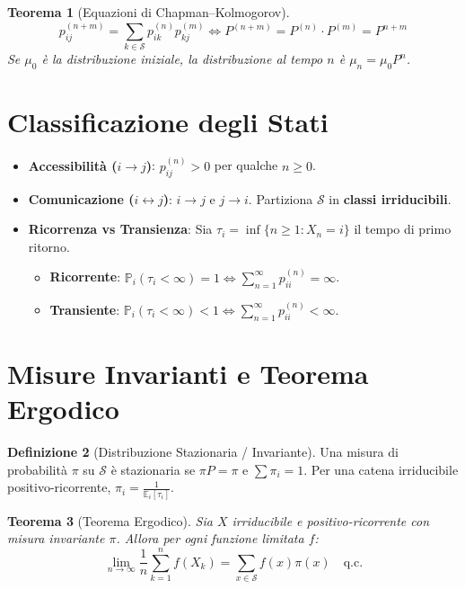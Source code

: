 \documentclass[11pt, a4paper]{report}
\theoremstyle{plain}
\newtheorem{theorem}{Teorema}[chapter]
\theoremstyle{definition}
\newtheorem{definition}[theorem]{Definizione}
\theoremstyle{remark}
\newcommand{\PP}{\mathbb{P}}
\newcommand{\E}{\mathbb{E}}
\newcommand{\1}{\mathbf{1}}
\begin{document}
\begin{theorem}[Equazioni di Chapman--Kolmogorov]
\[ p_{ij}^{(n+m)} = \sum_{k \in \mathcal{S}} p_{ik}^{(n)} p_{kj}^{(m)} \iff P^{(n+m)} = P^{(n)} \cdot P^{(m)} = P^{n+m} \]
Se $\mu_0$ è la distribuzione iniziale, la distribuzione al tempo $n$ è $\mu_n = \mu_0 P^n$.
\end{theorem}

\section{Classificazione degli Stati}

\begin{itemize}
    \item \textbf{Accessibilità ($i \to j$)}: $p_{ij}^{(n)} > 0$ per qualche $n \ge 0$.
    \item \textbf{Comunicazione ($i \leftrightarrow j$)}: $i \to j$ e $j \to i$. Partiziona $\mathcal{S}$ in \textbf{classi irriducibili}.
    \item \textbf{Ricorrenza vs Transienza}: Sia $\tau_i = \inf\{n \ge 1 : X_n = i\}$ il tempo di primo ritorno.
    \begin{itemize}
        \item \textbf{Ricorrente}: $\PP_i(\tau_i < \infty) = 1 \iff \sum_{n=1}^\infty p_{ii}^{(n)} = \infty$.
        \item \textbf{Transiente}: $\PP_i(\tau_i < \infty) < 1 \iff \sum_{n=1}^\infty p_{ii}^{(n)} < \infty$.
    \end{itemize}
\end{itemize}

\section{Misure Invarianti e Teorema Ergodico}

\begin{definition}[Distribuzione Stazionaria / Invariante]
Una misura di probabilità $\pi$ su $\mathcal{S}$ è stazionaria se $\pi P = \pi$ e $\sum \pi_i = 1$.
Per una catena irriducibile positivo-ricorrente, $\pi_i = \frac{1}{\E_i[\tau_i]}$.
\end{definition}

\begin{theorem}[Teorema Ergodico]
Sia $X$ irriducibile e positivo-ricorrente con misura invariante $\pi$. Allora per ogni funzione limitata $f$:
\[ \lim_{n \to \infty} \frac{1}{n} \sum_{k=1}^n f(X_k) = \sum_{x \in \mathcal{S}} f(x) \pi(x) \quad \text{q.c.} \]
\end{theorem}
\end{document}
